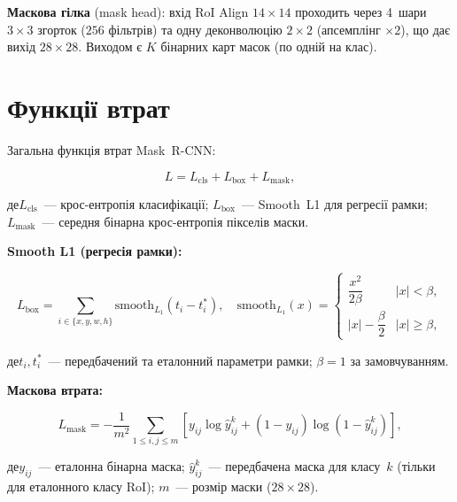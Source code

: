 \documentclass[14pt,a4paper]{extreport}
\newcommand{\where}{\par\noindent де\quad}
\begin{document}
\textbf{Маскова гілка} (mask head): вхід RoI Align $14\!\times\!14$
проходить через 4~шари $3\!\times\!3$ згорток ($256$ фільтрів) та одну
деконволюцію $2\!\times\!2$ (апсемплінг $\times2$), що дає вихід
$28\!\times\!28$. Виходом є $K$ бінарних карт масок (по одній на клас).

\section{Функції втрат}

Загальна функція втрат Mask~R-CNN:

\begin{equation}
  L = L_{\mathrm{cls}} + L_{\mathrm{box}} + L_{\mathrm{mask}},
  \label{eq:total_loss}
\end{equation}

\where $L_{\mathrm{cls}}$~--- крос-ентропія класифікації;
$L_{\mathrm{box}}$~--- Smooth~L1 для регресії рамки;
$L_{\mathrm{mask}}$~--- середня бінарна крос-ентропія пікселів маски.

\textbf{Smooth L1 (регресія рамки):}

\begin{equation}
  L_{\mathrm{box}} = \sum_{i\in\{x,y,w,h\}}
    \mathrm{smooth}_{L_1}\!\left(t_i - t^*_i\right),
  \quad
  \mathrm{smooth}_{L_1}(x) =
  \begin{cases}
    \dfrac{x^2}{2\beta} & |x| < \beta, \\[4pt]
    |x| - \dfrac{\beta}{2} & |x| \geq \beta,
  \end{cases}
  \label{eq:smooth_l1}
\end{equation}

\where $t_i, t^*_i$~--- передбачений та еталонний параметри рамки;
$\beta = 1$ за замовчуванням.

\textbf{Маскова втрата:}

\begin{equation}
  L_{\mathrm{mask}} = -\frac{1}{m^2}\sum_{1\leq i,j\leq m}
    \left[y_{ij}\log\hat{y}^k_{ij}
    + (1-y_{ij})\log(1-\hat{y}^k_{ij})\right],
  \label{eq:mask_loss}
\end{equation}

\where $y_{ij}$~--- еталонна бінарна маска; $\hat{y}^k_{ij}$~--- передбачена
маска для класу~$k$ (тільки для еталонного класу RoI); $m$~--- розмір
маски ($28\!\times\!28$).

\end{document}
